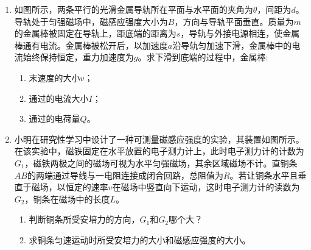 \begin{enumerate}
\newpage
\item
{}
如图所示，两条平行的光滑金属导轨所在平面与水平面的夹角为$ \theta $，间距为$ d $。导轨处于匀强磁场中，磁感应强度大小为$ B $，方向与导轨平面垂直。质量为$ m $的金属棒被固定在导轨上，距底端的距离为$ s $，导轨与外接电源相连，使金属棒通有电流。金属棒被松开后，以加速度$ a $沿导轨匀加速下滑，金属棒中的电流始终保持恒定，重力加速度为$ g $。求下滑到底端的过程中，金属棒:
\begin{enumerate}
\renewcommand{\labelenumi}{\arabic{enumi}.}
\item
末速度的大小$ v $；
\item 
通过的电流大小$ I $；
\item 
通过的电荷量$ Q $。

\end{enumerate}
\begin{figure}[h!]
\flushright

\end{figure}




\newpage
\item
{}
小明在研究性学习中设计了一种可测量磁感应强度的实验，其装置如图所示。在该实验中，磁铁固定在水平放置的电子测力计上，此时电子测力计的计数为$ G_{1} $，磁铁两极之间的磁场可视为水平匀强磁场，其余区域磁场不计。直铜条$ AB $的两端通过导线与一电阻连接成闭合回路，总阻值为$ R $。若让铜条水平且垂直于磁场，以恒定的速率$ v $在磁场中竖直向下运动，这时电子测力计的读数为$ G_{2} $，铜条在磁场中的长度$ L $。
\begin{enumerate}
\renewcommand{\labelenumi}{\arabic{enumi}.}
\item
判断铜条所受安培力的方向，$ G_{1} $和$ G_{2} $哪个大？
\item 
求铜条匀速运动时所受安培力的大小和磁感应强度的大小。




\end{enumerate}
\end{enumerate}
